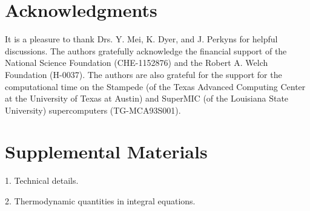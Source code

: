 \documentclass[aip,jcp,preprint,superscriptaddress,showpacs,preprintnumbers,amsmath,amssymb]{revtex4-1}
\begin{document}
\section{Acknowledgments}





It is a pleasure to thank Drs. Y. Mei, K. Dyer, and J. Perkyns
for helpful discussions.
%
The authors gratefully acknowledge the financial support
of the National Science Foundation (CHE-1152876)
and the Robert A. Welch Foundation (H-0037).
%
The authors are also grateful for the support
for the computational time on the Stampede
(of the Texas Advanced Computing Center
at the University of Texas at Austin)\cite{stampede}
and SuperMIC
(of the Louisiana State University)\cite{supermic}
supercomputers (TG-MCA93S001).





\section{Supplemental Materials}


1. Technical details.

2. Thermodynamic quantities in integral equations.






\end{document}
